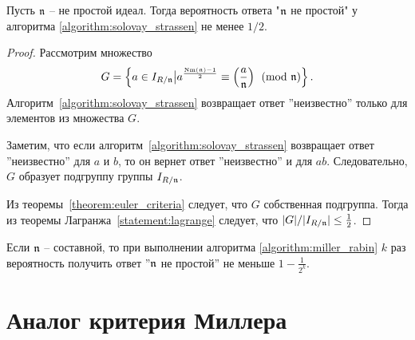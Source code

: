 \documentclass[_00_dissertation.tex]{subfiles}
\begin{document}
\begin{proposition}
    Пусть $\mathfrak{n}$ -- не простой идеал.
    Тогда вероятность ответа "$\mathfrak{n}$ не простой" у алгоритма \ref{algorithm:solovay_strassen} не менее $1/2$.
\end{proposition}
\begin{proof}
    Рассмотрим множество
    \begin{equation*}
        G = \left\{
            a \in I_{R/\mathfrak{n}} \big| a^{\frac{\textrm{Nm}(\mathfrak{n}) - 1}{2}} \equiv \left(\frac{a}{\mathfrak{n}}\right) \pmod{\mathfrak{n}}
        \right\}.
    \end{equation*}
    Алгоритм~\ref{algorithm:solovay_strassen} возвращает ответ ''неизвестно'' только для элементов из множества $G$.

    Заметим, что если алгоритм~\ref{algorithm:solovay_strassen} возвращает ответ ''неизвестно'' для $a$ и $b$, то он вернет ответ ''неизвестно'' и для $ab$.
    Следовательно, $G$ образует подгруппу группы $I_{R/\mathfrak{n}}$.

    Из теоремы~\ref{theorem:euler_criteria} следует, что $G$ собственная подгруппа.
    Тогда из теоремы Лагранжа~\ref{statement:lagrange} следует, что $|G|/|I_{R/\mathfrak{n}}| \le \frac{1}{2}$.
\end{proof}

\begin{remark}
    Если $\mathfrak{n}$ -- составной, то при выполнении алгоритма \ref{algorithm:miller_rabin} $k$ раз вероятность получить ответ ''$\mathfrak{n}$ не простой'' не меньше $1 - \frac{1}{2^k}$.
\end{remark}

\section{Аналог критерия Миллера}
\end{document}

